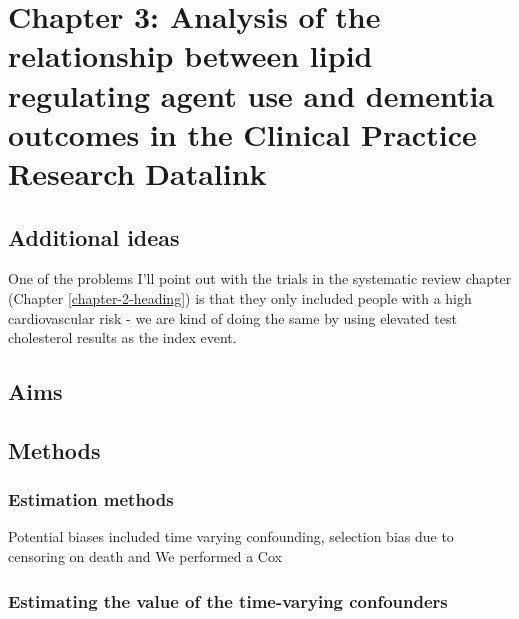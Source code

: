 \documentclass[a4paper, nobind]{templates/ociamthesis}
\begin{document}
\hypertarget{chapter-3-analysis-of-the-relationship-between-lipid-regulating-agent-use-and-dementia-outcomes-in-the-clinical-practice-research-datalink}{%
\chapter{Chapter 3: Analysis of the relationship between lipid regulating agent use and dementia outcomes in the Clinical Practice Research Datalink}\label{chapter-3-analysis-of-the-relationship-between-lipid-regulating-agent-use-and-dementia-outcomes-in-the-clinical-practice-research-datalink}}

\minitoc 

\hypertarget{additional-ideas-1}{%
\section{Additional ideas}\label{additional-ideas-1}}

One of the problems I'll point out with the trials in the systematic review chapter (Chapter \ref{chapter-2-heading}) is that they only included people with a high cardiovascular risk - we are kind of doing the same by using elevated test cholesterol results as the index event.

\hypertarget{aims-1}{%
\section{Aims}\label{aims-1}}

\hypertarget{methods-1}{%
\section{Methods}\label{methods-1}}

\hypertarget{estimation-methods}{%
\subsection{Estimation methods}\label{estimation-methods}}

Potential biases included time varying confounding, selection bias due to censoring on death and
We performed a Cox

\hypertarget{estimating-the-value-of-the-time-varying-confounders}{%
\subsection{Estimating the value of the time-varying confounders}\label{estimating-the-value-of-the-time-varying-confounders}}
\end{document}
